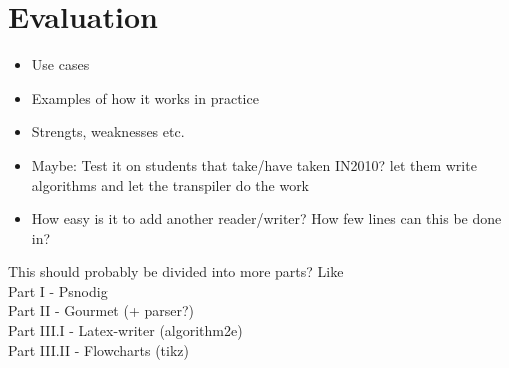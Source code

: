 \chapter{Evaluation}
\begin{itemize}
    \item Use cases
    \item Examples of how it works in practice
    \item Strengts, weaknesses etc.
    \item Maybe: Test it on students that take/have taken IN2010? let them write algorithms and let the transpiler do the work
    \item How easy is it to add another reader/writer? How few lines can this be done in?
\end{itemize}

This should probably be divided into more parts? Like \\

Part I - Psnodig \\
Part II - Gourmet (+ parser?) \\
Part III.I - Latex-writer (algorithm2e) \\
Part III.II - Flowcharts (tikz)